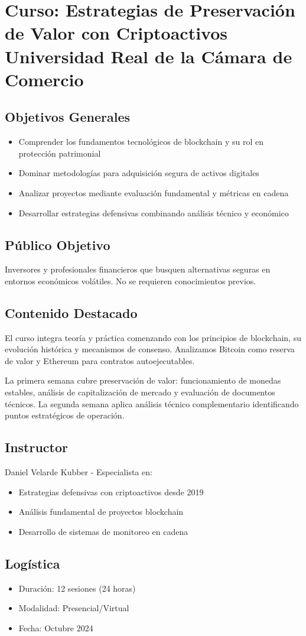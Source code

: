\documentclass{article}
\begin{document}
\section*{\centering Curso: Estrategias de Preservación de Valor con Criptoactivos\\Universidad Real de la Cámara de Comercio}

\subsection*{Objetivos Generales}
\begin{itemize}
    \item Comprender los fundamentos tecnológicos de blockchain y su rol en protección patrimonial
    \item Dominar metodologías para adquisición segura de activos digitales
    \item Analizar proyectos mediante evaluación fundamental y métricas en cadena
    \item Desarrollar estrategias defensivas combinando análisis técnico y económico
\end{itemize}

\subsection*{Público Objetivo}
Inversores y profesionales financieros que busquen alternativas seguras en entornos económicos volátiles. No se requieren conocimientos previos.

\subsection*{Contenido Destacado}
El curso integra teoría y práctica comenzando con los principios de blockchain, su evolución histórica y mecanismos de consenso. Analizamos Bitcoin como reserva de valor y Ethereum para contratos autoejecutables.

La primera semana cubre preservación de valor: funcionamiento de monedas estables, análisis de capitalización de mercado y evaluación de documentos técnicos. La segunda semana aplica análisis técnico complementario identificando puntos estratégicos de operación.

\subsection*{Instructor}
Daniel Velarde Kubber - Especialista en:
\begin{itemize}
    \item Estrategias defensivas con criptoactivos desde 2019
    \item Análisis fundamental de proyectos blockchain
    \item Desarrollo de sistemas de monitoreo en cadena
\end{itemize}

\subsection*{Logística}
\begin{itemize}
    \item Duración: 12 sesiones (24 horas)
    \item Modalidad: Presencial/Virtual
    \item Fecha: Octubre 2024
\end{itemize}
\end{document}
